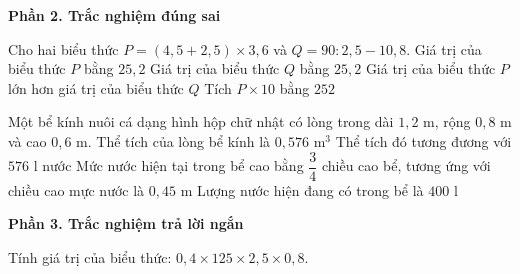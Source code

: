 \textbf{Phần 2. Trắc nghiệm đúng sai}

\begin{ex} %
Cho hai biểu thức $P = (4{,}5 + 2{,}5) \times 3{,}6$ và $Q = 90 : 2{,}5 - 10{,}8$.
\choiceTF
{\True Giá trị của biểu thức $P$ bằng $25{,}2$}
{\True Giá trị của biểu thức $Q$ bằng $25{,}2$}
{Giá trị của biểu thức $P$ lớn hơn giá trị của biểu thức $Q$}
{\True Tích $P \times 10$ bằng $252$}
\end{ex}

\begin{ex} %
Một bể kính nuôi cá dạng hình hộp chữ nhật có lòng trong dài $1{,}2\text{ m}$, rộng $0{,}8\text{ m}$ và cao $0{,}6\text{ m}$.
\choiceTF
{\True Thể tích của lòng bể kính là $0{,}576\text{ m}^3$}
{\True Thể tích đó tương đương với $576\text{ l}$ nước}
{\True Mức nước hiện tại trong bể cao bằng $\dfrac{3}{4}$ chiều cao bể, tương ứng với chiều cao mực nước là $0{,}45\text{ m}$}
{Lượng nước hiện đang có trong bể là $400\text{ l}$}
\end{ex}

\textbf{Phần 3. Trắc nghiệm trả lời ngắn}

\begin{ex} %
Tính giá trị của biểu thức: $0{,}4 \times 125 \times 2{,}5 \times 0{,}8$.
\end{ex}


